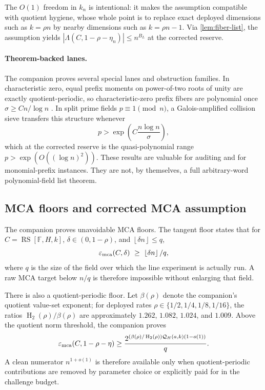 \documentclass[11pt]{article}
\theoremstyle{definition}
\newcommand{\F}{\mathbb F}
\newcommand{\RS}{\operatorname{RS}}
\newcommand{\Hbin}{\operatorname{H}_2}
\newcommand{\mca}{\varepsilon_{\rm mca}}
\newcommand{\Qprof}{\mathcal Q}
\newcommand{\floor}[1]{\left\lfloor #1\right\rfloor}
\begin{document}
The $O(1)$ freedom in $k_n$ is intentional: it makes the assumption compatible with quotient hygiene, whose whole point is to replace exact deployed dimensions such as $k=\rho n$ by nearby dimensions such as $k=\rho n-1$.  Via \cref{lem:fiber-list}, the assumption yields $|\Lambda(C,1-\rho-\eta_n)|\le n^{B_L}$ at the corrected reserve.

\paragraph{Theorem-backed lanes.}
The companion proves several special lanes and obstruction families.  In characteristic zero, equal prefix moments on power-of-two roots of unity are exactly quotient-periodic, so characteristic-zero prefix fibers are polynomial once $\sigma\ge Cn/\log n$ \cite[Thm.~4.2, Cor.~4.3]{SlackMCAEntropyMerged}.  In split prime fields $p\equiv1\pmod n$, a Galois-amplified collision sieve \cite[Thm.~5.2, Cor.~5.3]{SlackMCAEntropyMerged} transfers this structure whenever
\[
        p>\exp\!\left(C\frac{n\log n}{\sigma}\right),
\]
which at the corrected reserve is the quasi-polynomial range $p>\exp(O((\log n)^2))$.  These results are valuable for auditing and for monomial-prefix instances.  They are not, by themselves, a full arbitrary-word polynomial-field list theorem.

\subsection{MCA floors and corrected MCA assumption}
\label{sec:mca-input}

The companion proves unavoidable MCA floors.  The tangent floor \cite[Prop.~9.4]{SlackMCAEntropyMerged} states that for $C=\RS[\F,H,k]$, $\delta\in(0,1-\rho)$, and $\floor{\delta n}\le q$,
\begin{equation}
\label{eq:tangent-floor}
        \mca(C,\delta)\ \ge\ \floor{\delta n}/q ,
\end{equation}
where $q$ is the size of the field over which the line experiment is actually run.  A raw MCA target below $n/q$ is therefore impossible without enlarging that field.

There is also a quotient-periodic floor.  Let $\beta(\rho)$ denote the companion's quotient value-set exponent; for deployed rates $\rho\in\{1/2,1/4,1/8,1/16\}$, the ratios $\Hbin(\rho)/\beta(\rho)$ are approximately $1.262$, $1.082$, $1.024$, and $1.009$.  Above the quotient norm threshold, the companion proves \cite[Prop.~19.1, Thm.~19.4]{SlackMCAEntropyMerged}
\begin{equation}
\label{eq:mca-necessity}
        \mca(C,1-\rho-\eta)
        \ge
        \frac{2^{(\beta(\rho)/\Hbin(\rho))\Qprof_H(a,k)(1-o(1))}}{q} .
\end{equation}
A clean numerator $n^{1+o(1)}$ is therefore available only when quotient-periodic contributions are removed by parameter choice or explicitly paid for in the challenge budget.
\end{document}
